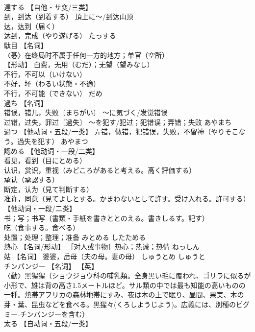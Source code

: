 \documentclass[8pt]{extreport}
\begin{document}
\begin{CJK}{UTF8}{min}
\\	達する	【自他・サ变/三类】 
\\	到，到达（到着する） 頂上に～/到达山顶 
\\	达，达到（届く） 
\\	达到，完成（やり遂げる）	たっする	
\\	駄目	【名词】 
\\	〈碁〉在终局时不属于任何一方的地方；单官（空所） 
\\	【形动】 白费，无用（むだ）；无望（望みなし） 
\\	不行，不可以（いけない） 
\\	不好，坏（わるい状態・不適） 
\\	不行，不可能（できない）	だめ	
\\	過ち	【名词】 
\\	错误，错儿，失败〔まちがい〕 ～に気づく/发觉错误 
\\	过错，过失，罪过〔過失〕 ～を犯す/犯过；犯错误；弄错；失败	あやまち	
\\	過つ	【他动词・五段/一类】 弄错，做错，犯错误，失败，不留神（やりそこなう。過失を犯す）	あやまつ	
\\	認める	【他动词・一段/二类】 
\\	看见，看到（目にとめる） 
\\	认识，赏识，重视（みどころがあると考える。高く評価する） 
\\	承认（承認する） 
\\	断定，认为（見て判断する） 
\\	准许，同意（見てよしとする。かまわないとして許す。受け入れる。許可する） 【他动词・一段/二类】 
\\	书；写；书写（書類・手紙を書きととのえる。書きしるす。記す） 
\\	吃（食事する。食べる） 
\\	处置；处理；整理；准备	みとめる したためる	
\\	熱心	【名词/形动】 ［对人或事物］热心；热诚；热情	ねっしん	
\\	姑	【名词】 婆婆，岳母（夫の母。妻の母）	しゅうとめ しゅうと	
\\	チンパンジー	【名词】 【英】
\\	〈動〉黑猩猩（ショウジョウ科の哺乳類。全身黒い毛に覆われ、ゴリラに似るが小形で、雄は背の高さ1.5メートルほど。サル類の中では最も知能の高いものの一種。熱帯アフリカの森林地帯にすみ、夜は木の上で眠り、昼間、果実、木の芽・葉、昆虫などを食べる。黒猩々(くろしようじよう)。広義には、別種のピグミー-チンパンジーを含む）		
\\	太る	【自动词・五段/一类】 

\end{CJK}
\end{document}
